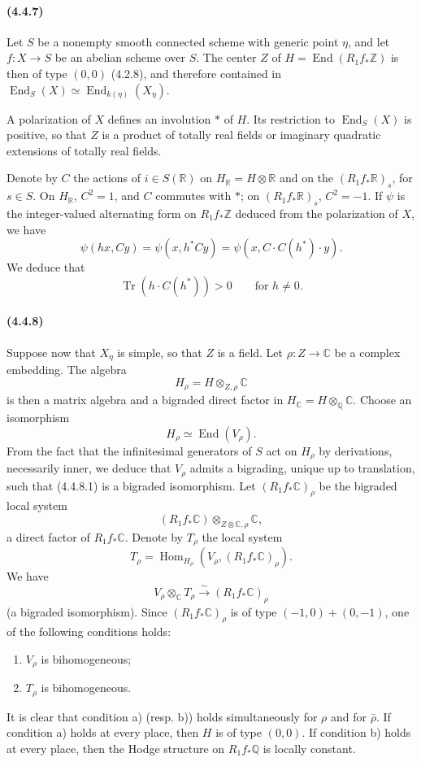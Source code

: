 \documentclass[10pt]{article}
\newcommand{\C}{\mathbb C}
\newcommand{\Q}{\mathbb Q}
\newcommand{\Z}{\mathbb Z}
\newcommand{\Hom}{\operatorname{Hom}}
\newcommand{\iso}{\xrightarrow{\sim}}
\newcommand{\R}{\mathbb R}
\providecommand{\End}{\operatorname{End}}
\newcommand{\Tr}{\operatorname{Tr}}
\begin{document}
\paragraph{(4.4.7)} Let $S$ be a nonempty smooth connected scheme with generic point $\eta$, and let $f:X\to S$ be an abelian scheme over $S$. The center $Z$ of $H=\End(R_1f_*\Z)$ is then of type $(0,0)$ (4.2.8), and therefore contained in $\End_S(X)\simeq \End_{k(\eta)}(X_\eta)$.

A polarization of $X$ defines an involution $*$ of $H$. Its restriction to $\End_S(X)$ is positive, so that $Z$ is a product of totally real fields or imaginary quadratic extensions of totally real fields.

Denote by $C$ the actions of $i\in S(\R)$ on $H_\R=H\otimes\R$ and on the $(R_1f_*\R)_s$, for $s\in S$. On $H_\R$, $C^2=1$, and $C$ commutes with $*$; on $(R_1f_*\R)_s$, $C^2=-1$. If $\psi$ is the integer-valued alternating form on $R_1f_*\Z$ deduced from the polarization of $X$, we have
\[
\psi(hx,Cy)=\psi(x,h^*Cy)=\psi(x,C\cdot C(h^*)\cdot y).
\]
We deduce that
\[
\tag{4.4.7.1}
\Tr(h\cdot C(h^*))>0\qquad\text{for }h\ne0.
\]

\paragraph{(4.4.8)} Suppose now that $X_\eta$ is simple, so that $Z$ is a field. Let $\rho:Z\to\C$ be a complex embedding. The algebra
\[
H_\rho=H\otimes_{Z,\rho}\C
\]
is then a matrix algebra and a bigraded direct factor in $H_\C=H\otimes_\Q\C$. Choose an isomorphism
\[
\tag{4.4.8.1}
H_\rho\simeq\End(V_\rho).
\]
From the fact that the infinitesimal generators of $S$ act on $H_\rho$ by derivations, necessarily inner, we deduce that $V_\rho$ admits a bigrading, unique up to translation, such that (4.4.8.1) is a bigraded isomorphism. Let $(R_1f_*\C)_\rho$ be the bigraded local system
\[
(R_1f_*\C)\otimes_{Z\otimes\C,\rho}\C,
\]
a direct factor of $R_1f_*\C$. Denote by $T_\rho$ the local system
\[
T_\rho=\Hom_{H_\rho}(V_\rho,(R_1f_*\C)_\rho).
\]
We have
\[
\tag{4.4.8.2}
V_\rho\otimes_\C T_\rho\iso (R_1f_*\C)_\rho
\]
(a bigraded isomorphism). Since $(R_1f_*\C)_\rho$ is of type $(-1,0)+(0,-1)$, one of the following conditions holds:
\begin{enumerate}[label=\alph*)]
\item $V_\rho$ is bihomogeneous;
\item $T_\rho$ is bihomogeneous.
\end{enumerate}
It is clear that condition a) (resp. b)) holds simultaneously for $\rho$ and for $\bar\rho$. If condition a) holds at every place, then $H$ is of type $(0,0)$. If condition b) holds at every place, then the Hodge structure on $R_1f_*\Q$ is locally constant.
\end{document}
